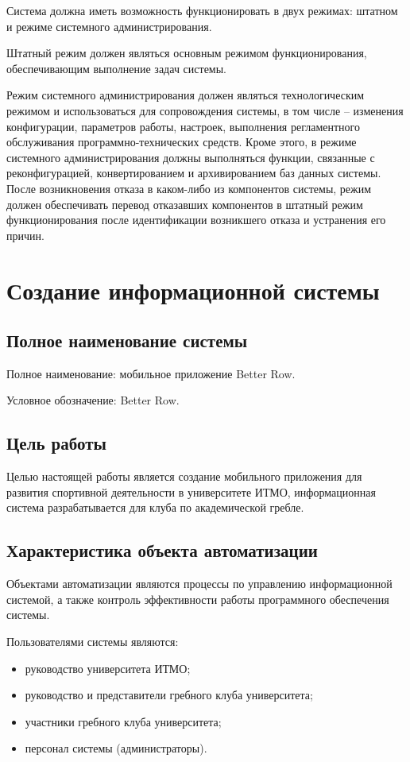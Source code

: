 \documentclass[14pt]{extreport}
\begin{document}
Система должна иметь возможность функционировать в двух
режимах: штатном и режиме системного администрирования.

Штатный режим должен являться основным режимом
функционирования, обеспечивающим выполнение задач системы.

Режим системного администрирования должен являться технологическим
режимом и использоваться для сопровождения системы, в том числе –
изменения конфигурации, параметров работы, настроек, выполнения
регламентного обслуживания программно-технических средств. Кроме этого, в
режиме системного администрирования должны выполняться функции,
связанные с реконфигурацией, конвертированием и архивированием баз
данных системы. После возникновения отказа в каком-либо из компонентов
системы, режим должен обеспечивать перевод отказавших компонентов в
штатный режим функционирования после идентификации возникшего отказа и
устранения его причин.

\section{Создание информационной системы}

\subsection{Полное наименование системы}

Полное наименование: мобильное приложение Better Row.

Условное обозначение: Better Row.

\subsection{Цель работы}

Целью настоящей работы является создание мобильного приложения для развития спортивной деятельности в университете ИТМО, информационная система разрабатывается для клуба по академической гребле.

\subsection{Характеристика объекта автоматизации}

Объектами автоматизации являются процессы по управлению информационной системой, а также контроль эффективности работы программного обеспечения системы. 

Пользователями системы являются:
\begin{itemize}
\item руководство университета ИТМО;
\item руководство и представители гребного клуба университета;
\item участники гребного клуба университета;
\item персонал системы (администраторы).
\end{itemize}
\end{document}
